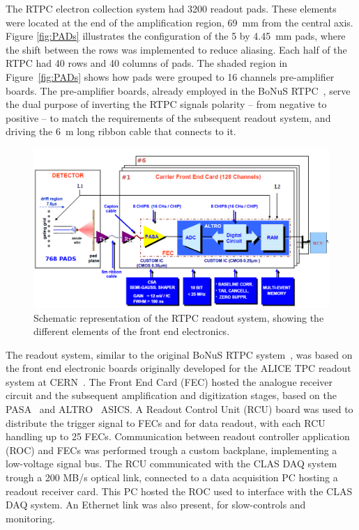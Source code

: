 \documentclass[preprint,5p]{elsarticle}
\begin{document}
The RTPC electron collection system had 3200 readout pads. These elements were
located at the end of the amplification region, 69~mm from the central axis.
Figure \ref{fig:PADs} illustrates the configuration of the 5 by 4.45~mm pads,
where the shift between the rows was implemented to reduce aliasing. Each half 
of the RTPC had 40 rows and 40 columns of pads. The shaded region in 
Figure~\ref{fig:PADs} shows how pads were grouped to 16 channels pre-amplifier 
boards. The pre-amplifier boards, already employed in the BoNuS 
RTPC~\cite{Fenker:2008zz}, serve the dual purpose of inverting the RTPC signals 
polarity -- from negative to positive -- to match the requirements of the 
subsequent readout system, and driving the 6~m long ribbon cable that connects 
to it.

\begin{figure}[tb]
   \centering
   \includegraphics[width=.75\textwidth]{ReadoutScheme.png}
   \caption[]{Schematic representation of the RTPC readout system, showing
   the different elements of the front end electronics.} 
   \label{fig:ReadoutScheme}
\end{figure}

The readout system, similar to the original BoNuS RTPC system~\cite{Fenker:2008zz}, 
was based on the front end electronic boards originally developed for the ALICE 
TPC readout system at CERN~\cite{ALICE-FEE}. The Front End Card (FEC) hosted 
the analogue receiver circuit and the subsequent amplification and digitization 
stages, based on the PASA~\cite{Soltveit:2012jp} and 
ALTRO~\cite{EsteveBosch:2003bj} ASICS. A Readout Control Unit (RCU) board was 
used to distribute the trigger signal to FECs and for data readout, with each 
RCU handling up to 25 FECs. Communication between readout controller 
application (ROC) and FECs was performed trough a custom backplane, 
implementing a low-voltage signal bus. The RCU communicated with the CLAS DAQ 
system trough a 200 MB/s optical link, connected to a data acquisition PC 
hosting a readout receiver card. This PC hosted the ROC used to interface with 
the CLAS DAQ system. An Ethernet link was also present, for slow-controls and 
monitoring.
\end{document}
